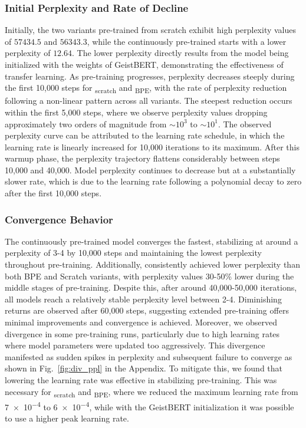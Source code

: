 \subsubsection{Initial Perplexity and Rate of Decline}
Initially, the two \ChristBERT{} variants pre-trained from scratch exhibit high
perplexity values of $57434.5$ and $56343.3$, while the continuously pre-trained
\ChristBERT{} starts with a lower perplexity of $12.64$. The lower perplexity
directly results from the model being initialized with the weights of GeistBERT,
demonstrating the effectiveness of transfer learning. As pre-training
progresses, perplexity decreases steeply during the first 10,000 steps for
\ChristBERT\textsubscript{scratch} and \ChristBERT\textsubscript{BPE}, with the
rate of perplexity reduction following a non-linear pattern across all variants.
The steepest reduction occurs within the first 5,000 steps, where we observe
perplexity values dropping approximately two orders of magnitude from ${\sim}
10^3$ to ${\sim} 10^1$. The observed perplexity curve can be attributed to the
learning rate schedule, in which the learning rate is linearly increased for
10,000 iterations to its maximum. After this warmup phase, the perplexity
trajectory flattens considerably between steps 10,000 and 40,000. Model
perplexity continues to decrease but at a substantially slower rate, which is
due to the learning rate following a polynomial decay to zero after the first
10,000 steps.

\subsubsection{Convergence Behavior}
The continuously pre-trained \ChristBERT{} model converges the fastest,
stabilizing at around a perplexity of 3-4 by 10,000 steps and maintaining the
lowest perplexity throughout pre-training. Additionally, \ChristBERT{}
consistently achieved lower perplexity than both BPE and Scratch variants, with
perplexity values 30-50\% lower during the middle stages of pre-training.
Despite this, after around 40,000-50,000 iterations, all models reach a
relatively stable perplexity level between 2-4. Diminishing returns are observed
after 60,000 steps, suggesting extended pre-training offers minimal improvements
and convergence is achieved. Moreover, we observed divergence in some
pre-training runs, particularly due to high learning rates where model
parameters were updated too aggressively. This divergence manifested as sudden
spikes in perplexity and subsequent failure to converge as shown in
Fig.~\ref{fig:div_ppl} in the Appendix. To mitigate this, we found that lowering
the learning rate was effective in stabilizing pre-training. This was necessary
for \ChristBERT\textsubscript{scratch} and \ChristBERT\textsubscript{BPE}, where
we reduced the maximum learning rate from \num{7e-4} to \num{6e-4}, while with
the GeistBERT initialization it was possible to use a higher peak learning rate.
\\

